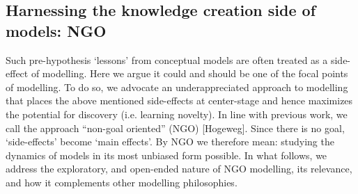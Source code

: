 \subsection{Harnessing the knowledge creation side of models: NGO}

Such pre-hypothesis `lessons’ from conceptual models are often treated as a side-effect of modelling.  Here we argue it could and should be one of the focal points of modelling. To do so, we advocate an underappreciated approach to modelling that places the above mentioned side-effects at center-stage and hence maximizes the potential for discovery (i.e. learning novelty). In line with previous work, we call the approach “non-goal oriented” (NGO)   [Hogeweg]. Since there is no goal, ‘side-effects’ become ‘main effects’.  By NGO we therefore mean: studying the dynamics of models in its most unbiased form possible. In what follows, we address the exploratory, and open-ended nature of NGO modelling, its relevance, and how it complements other modelling philosophies.

  